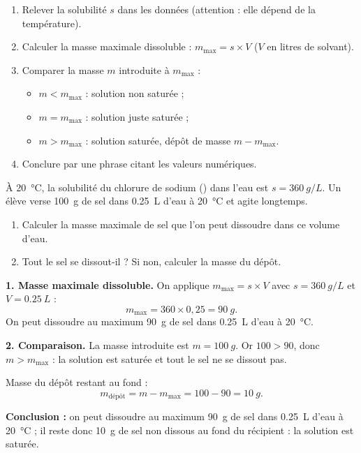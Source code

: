 \documentclass[11pt]{article}
\newcommand{\cle}[1]{{\popxbold\color{popdark}#1}}
\begin{document}
\begin{methode}
\begin{enumerate}
\item Relever la solubilité $s$ dans les données (attention : elle dépend de la température).
\item Calculer la masse maximale dissoluble : $m_{\max} = s \times V$ ($V$ en litres de solvant).
\item Comparer la masse $m$ introduite à $m_{\max}$ :
\begin{itemize}
\item $m < m_{\max}$ : solution non saturée ;
\item $m = m_{\max}$ : solution juste saturée ;
\item $m > m_{\max}$ : solution saturée, dépôt de masse $m - m_{\max}$.
\end{itemize}
\item Conclure par une phrase citant les valeurs numériques.
\end{enumerate}
\end{methode}

\begin{exoresolu}
À \SI{20}{\celsius}, la solubilité du chlorure de sodium () dans l'eau est $s = \SI{360}{g/L}$. Un élève verse \SI{100}{g} de sel dans \SI{0,25}{L} d'eau à \SI{20}{\celsius} et agite longtemps.
\begin{enumerate}
\item Calculer la masse maximale de sel que l'on peut dissoudre dans ce volume d'eau.
\item Tout le sel se dissout-il ? Si non, calculer la masse du dépôt.
\end{enumerate}
\tcblower
\textbf{1. Masse maximale dissoluble.}
On applique $m_{\max} = s \times V$ avec $s = \SI{360}{g/L}$ et $V = \SI{0,25}{L}$ :
\[ m_{\max} = 360 \times 0,25 = \SI{90}{g}. \]
On peut dissoudre au maximum \SI{90}{g} de sel dans \SI{0,25}{L} d'eau à \SI{20}{\celsius}.

\textbf{2. Comparaison.}
La masse introduite est $m = \SI{100}{g}$. Or $100 > 90$, donc $m > m_{\max}$ : la solution est \cle{saturée} et tout le sel ne se dissout pas.

Masse du dépôt restant au fond :
\[ m_{\text{dépôt}} = m - m_{\max} = 100 - 90 = \SI{10}{g}. \]

\textbf{Conclusion :} on peut dissoudre au maximum \SI{90}{g} de sel dans \SI{0,25}{L} d'eau à \SI{20}{\celsius} ; il reste donc \SI{10}{g} de sel non dissous au fond du récipient : la solution est saturée.
\end{exoresolu}
\end{document}

